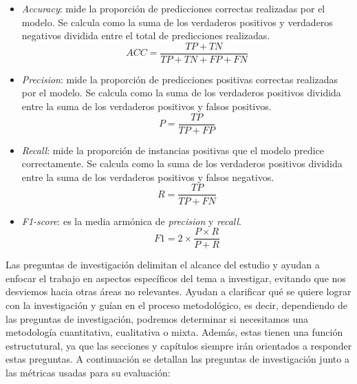 \begin{itemize}
    \item \textit{Accuracy}: mide la proporción de predicciones correctas realizadas por el
          modelo. Se calcula como la suma de los verdaderos positivos y verdaderos negativos
          dividida entre el total de predicciones realizadas.
            \begin{equation}
                  ACC = \frac{TP + TN}{TP + TN + FP + FN}
                  \label{eq:accuracy}
            \end{equation}
    \item \textit{Precision}: mide la proporción de predicciones positivas correctas realizadas
          por el modelo. Se calcula como la suma de los verdaderos positivos dividida entre la
          suma de los verdaderos positivos y falsos positivos.
            \begin{equation}
                  P = \frac{TP}{TP + FP}
                  \label{eq:precision}
            \end{equation}
    \item \textit{Recall}: mide la proporción de instancias positivas que el modelo predice
          correctamente. Se calcula como la suma de los verdaderos positivos dividida entre la
          suma de los verdaderos positivos y falsos negativos.
            \begin{equation}
                  R = \frac{TP}{TP + FN}
                  \label{eq:recall}
            \end{equation}
    \item \textit{F1-score}: es la media armónica de \textit{precision} y \textit{recall}.
            \begin{equation}
                  F1 = 2 \times \frac{P \times R}{P + R}
                  \label{eq:f1_score}
            \end{equation}
\end{itemize}

Las preguntas de investigación delimitan el alcance del estudio y ayudan a enfocar el trabajo en
aspectos específicos del tema a investigar, evitando que nos desviemos hacia otras áreas no
relevantes. Ayudan a clarificar qué se quiere lograr con la investigación y guían en el proceso
metodológico, es decir, dependiendo de las preguntas de investigación, podremos determinar
si necesitamos una metodología cuantitativa, cualitativa o mixta. Además, estas tienen una
función estructutural, ya que las secciones y capítulos siempre irán orientados a responder
estas preguntas. A continuación se detallan las preguntas de investigación junto a las
métricas usadas para su evaluación:


